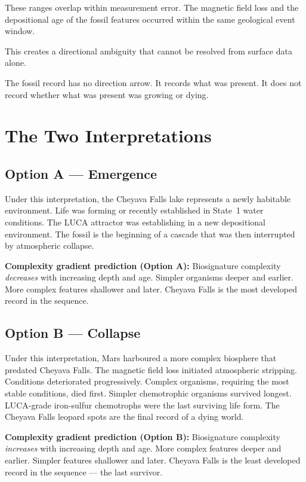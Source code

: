 \documentclass[11pt, a4paper]{article}
\begin{document}
These ranges overlap within measurement error.
The magnetic field loss and the depositional age of
the fossil features occurred within the same
geological event window.

This creates a directional ambiguity that cannot be
resolved from surface data alone.

The fossil record has no direction arrow.
It records what was present.
It does not record whether what was present was
growing or dying.

\section{The Two Interpretations}

\subsection{Option A --- Emergence}

Under this interpretation, the Cheyava Falls lake
represents a newly habitable environment.
Life was forming or recently established in
State~1 water conditions.
The LUCA attractor was establishing in a new
depositional environment.
The fossil is the beginning of a cascade that
was then interrupted by atmospheric collapse.

\textbf{Complexity gradient prediction (Option A):}
Biosignature complexity \textit{decreases} with
increasing depth and age.
Simpler organisms deeper and earlier.
More complex features shallower and later.
Cheyava Falls is the most developed record
in the sequence.

\subsection{Option B --- Collapse}

Under this interpretation, Mars harboured a more
complex biosphere that predated Cheyava Falls.
The magnetic field loss initiated atmospheric
stripping. Conditions deteriorated progressively.
Complex organisms, requiring the most stable
conditions, died first.
Simpler chemotrophic organisms survived longest.
LUCA-grade iron-sulfur chemotrophs were the last
surviving life form.
The Cheyava Falls leopard spots are the final
record of a dying world.

\textbf{Complexity gradient prediction (Option B):}
Biosignature complexity \textit{increases} with
increasing depth and age.
More complex features deeper and earlier.
Simpler features shallower and later.
Cheyava Falls is the least developed record
in the sequence --- the last survivor.
\end{document}

